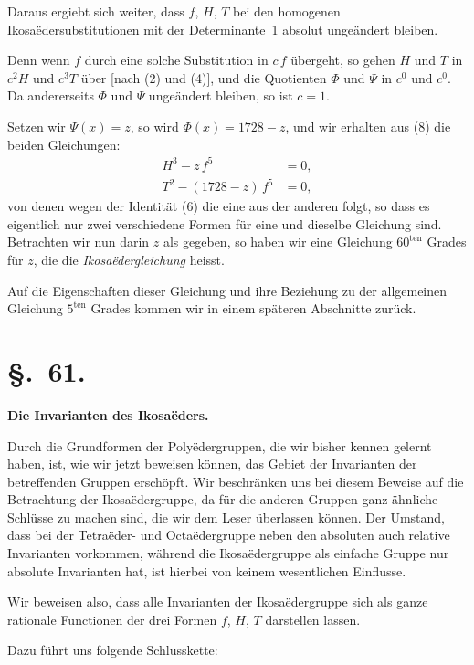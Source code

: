 \documentclass[12pt,a4paper]{article}
\newcommand{\sect}[1]{\section*{{\S.~#1.}}\addcontentsline{toc}{section}{\S.~#1}}
\begin{document}
Daraus ergiebt sich weiter, dass $f$, $H$, $T$ bei den homogenen Ikosaëdersubstitutionen mit der Determinante~1 absolut ungeändert bleiben.

Denn wenn $f$ durch eine solche Substitution in $c\,f$ übergeht, so gehen $H$ und $T$ in $c^{2}H$ und $c^{3}T$ über [nach (2) und (4)], und die Quotienten $\Phi$ und $\Psi$ in $c^{0}$ und $c^{0}$. Da andererseits $\Phi$ und $\Psi$ ungeändert bleiben, so ist $c = 1$.

Setzen wir $\Psi(x) = z$, so wird $\Phi(x) = 1728 - z$, und wir erhalten aus (8) die beiden Gleichungen:
\begin{align}
\label{eq:60.9}\tag{9} H^{3} - z\,f^{5} &= 0,\\
\label{eq:60.10}\tag{10} T^{2} - (1728 - z)\,f^{5} &= 0,
\end{align}
von denen wegen der Identität (6) die eine aus der anderen folgt, so dass es eigentlich nur zwei verschiedene Formen für eine und dieselbe Gleichung sind. Betrachten wir nun darin $z$ als gegeben, so haben wir eine Gleichung $60^{\text{ten}}$ Grades für $z$, die die \emph{Ikosaëdergleichung} heisst.

Auf die Eigenschaften dieser Gleichung und ihre Beziehung zu der allgemeinen Gleichung $5^{\text{ten}}$ Grades kommen wir in einem späteren Abschnitte zurück.



\newpage
\sect{61}
\begin{center}
\textbf{Die Invarianten des Ikosaëders.}
\end{center}
\label{sec:61}

Durch die Grundformen der Polyëdergruppen, die wir bisher kennen gelernt haben, ist, wie wir jetzt beweisen können, das Gebiet der Invarianten der betreffenden Gruppen erschöpft. Wir beschränken uns bei diesem Beweise auf die Betrachtung der Ikosaëdergruppe, da für die anderen Gruppen ganz ähnliche Schlüsse zu machen sind, die wir dem Leser überlassen können. Der Umstand, dass bei der Tetraëder- und Octaëdergruppe neben den absoluten auch relative Invarianten vorkommen, während die Ikosaëdergruppe als einfache Gruppe nur absolute Invarianten hat, ist hierbei von keinem wesentlichen Einflusse.

Wir beweisen also, dass alle Invarianten der Ikosaëdergruppe sich als ganze rationale Functionen der drei Formen $f$, $H$, $T$ darstellen lassen.

Dazu führt uns folgende Schlusskette:
\end{document}
